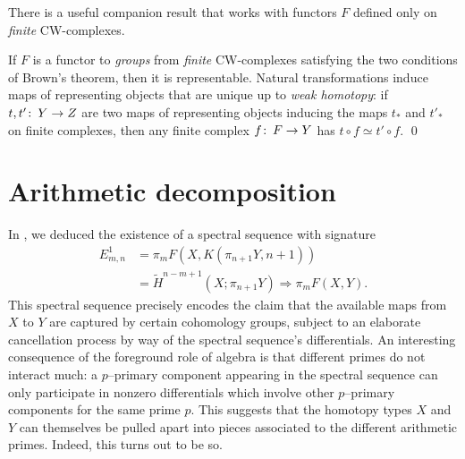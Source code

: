 There is a useful companion result that works with functors $F$ defined only on \emph{finite} CW-complexes.

\begin{theorem}[Adams]\label{BrownRepAdamsVersion}
If $F$ is a functor to \emph{groups} from \emph{finite} CW-complexes satisfying the two conditions of Brown's theorem, then it is representable.
Natural transformations induce maps of representing objects that are unique up to \emph{weak homotopy}: if $t, t'\colon\thinspace Y \to Z$ are two maps of representing objects inducing the maps $t_*$ and $t'_*$ on finite complexes, then any finite complex $f\colon\thinspace F \to Y$ has $t \circ f \simeq t' \circ f$. \qed
{}
\end{theorem}



\section{Arithmetic decomposition}


In , we deduced the existence of a spectral sequence with signature
\begin{align*}
E^1_{m, n} & = \pi_m F(X, K(\pi_{n+1} Y, n+1)) \\
& = \widetilde H^{n-m+1}(X; \pi_{n+1} Y) \Rightarrow \pi_m F(X, Y).
\end{align*}
This spectral sequence precisely encodes the claim that the available maps from $X$ to $Y$ are captured by certain cohomology groups, subject to an elaborate cancellation process by way of the spectral sequence's differentials.
An interesting consequence of the foreground role of algebra is that different primes do not interact much: a $p$--primary component appearing in the spectral sequence can only participate in nonzero differentials which involve other $p$--primary components for the same prime $p$.
This suggests that the homotopy types $X$ and $Y$ can themselves be pulled apart into pieces associated to the different arithmetic primes.
Indeed, this turns out to be so.

